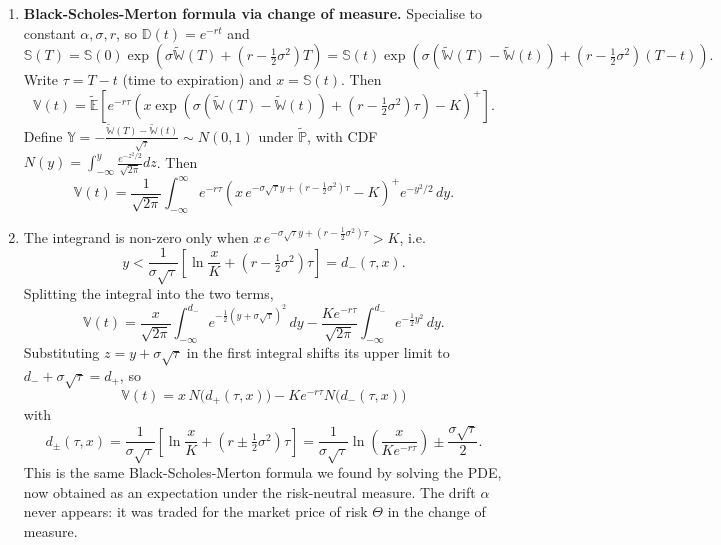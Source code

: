 \begin{enumerate}
    \item \textbf{Black-Scholes-Merton formula via change of measure.} Specialise to constant $\alpha, \sigma, r$, so $\mathbb{D}(t) = e^{-rt}$ and
    \[\mathbb{S}(T) = \mathbb{S}(0)\exp\!\left(\sigma\tilde{\mathbb{W}}(T) + \left(r - \tfrac{1}{2}\sigma^2\right)T\right) = \mathbb{S}(t)\exp\!\left(\sigma(\tilde{\mathbb{W}}(T) - \tilde{\mathbb{W}}(t)) + \left(r - \tfrac{1}{2}\sigma^2\right)(T - t)\right).\]
    Write $\tau = T - t$ (time to expiration) and $x = \mathbb{S}(t)$. Then
    \[\mathbb{V}(t) = \tilde{\mathbb{E}}\left[e^{-r\tau}\left(x\exp\!\left(\sigma(\tilde{\mathbb{W}}(T) - \tilde{\mathbb{W}}(t)) + \left(r - \tfrac{1}{2}\sigma^2\right)\tau\right) - K\right)^+\right].\]
    Define $\mathbb{Y} = -\frac{\tilde{\mathbb{W}}(T) - \tilde{\mathbb{W}}(t)}{\sqrt{\tau}} \sim N(0, 1)$ under $\tilde{\mathbb{P}}$, with CDF $N(y) = \int_{-\infty}^y\frac{e^{-z^2/2}}{\sqrt{2\pi}}dz$. Then
    \[\mathbb{V}(t) = \frac{1}{\sqrt{2\pi}}\int_{-\infty}^\infty e^{-r\tau}\left(x\, e^{-\sigma\sqrt{\tau}y + (r - \frac{1}{2}\sigma^2)\tau} - K\right)^+e^{-y^2/2}\, dy.\]

    \item The integrand is non-zero only when $x\,e^{-\sigma\sqrt{\tau}y + (r - \frac{1}{2}\sigma^2)\tau} > K$, i.e.
    \[y < \frac{1}{\sigma\sqrt{\tau}}\left[\ln\frac{x}{K} + \left(r - \tfrac{1}{2}\sigma^2\right)\tau\right] = d_-(\tau, x).\]
    Splitting the integral into the two terms,
    \[\mathbb{V}(t) = \frac{x}{\sqrt{2\pi}}\int_{-\infty}^{d_-}e^{-\frac{1}{2}(y + \sigma\sqrt{\tau})^2}\, dy - \frac{Ke^{-r\tau}}{\sqrt{2\pi}}\int_{-\infty}^{d_-}e^{-\frac{1}{2}y^2}\, dy.\]
    Substituting $z = y + \sigma\sqrt{\tau}$ in the first integral shifts its upper limit to $d_-+\sigma\sqrt{\tau} = d_+$, so
    \[\boxed{\mathbb{V}(t) = x\,N\bigl(d_+(\tau, x)\bigr) - Ke^{-r\tau}N\bigl(d_-(\tau, x)\bigr)}\]
    with
    \[d_\pm(\tau, x) = \frac{1}{\sigma\sqrt{\tau}}\left[\ln\frac{x}{K} + \left(r \pm \tfrac{1}{2}\sigma^2\right)\tau\right] = \frac{1}{\sigma\sqrt{\tau}}\ln\!\left(\frac{x}{Ke^{-r\tau}}\right) \pm \frac{\sigma\sqrt{\tau}}{2}.\]
    This is the same Black-Scholes-Merton formula we found by solving the PDE, now obtained as an expectation under the risk-neutral measure. The drift $\alpha$ never appears: it was traded for the market price of risk $\Theta$ in the change of measure.

\end{enumerate}
